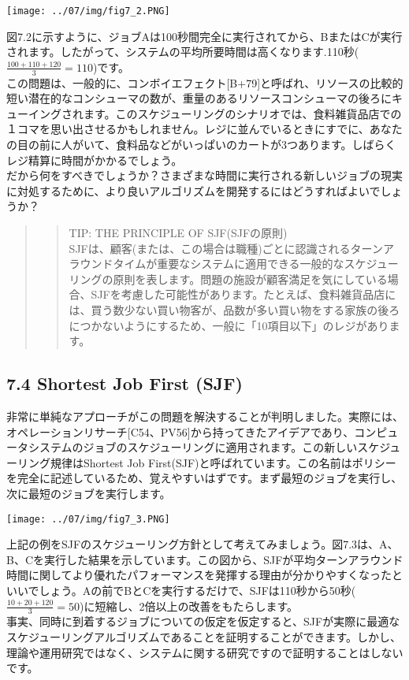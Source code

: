 \texttt{[image: ../07/img/fig7\_2.PNG]}

図7.2に示すように、ジョブAは100秒間完全に実行されてから、BまたはCが実行されます。したがって、システムの平均所要時間は高くなります.110秒(\(\frac{100 + 110 + 120}{3} = 110\))です。\\
この問題は、一般的に、コンボイエフェクト{[}B+79{]}と呼ばれ、リソースの比較的短い潜在的なコンシューマの数が、重量のあるリソースコンシューマの後ろにキューイングされます。このスケジューリングのシナリオでは、食料雑貨品店での１コマを思い出させるかもしれません。レジに並んでいるときにすでに、あなたの目の前に人がいて、食料品などがいっぱいのカートが3つあります。しばらくレジ精算に時間がかかるでしょう。\\
だから何をすべきでしょうか？さまざまな時間に実行される新しいジョブの現実に対処するために、より良いアルゴリズムを開発するにはどうすればよいでしょうか？

\begin{quote}
\begin{quote}
TIP: THE PRINCIPLE OF SJF(SJFの原則)\\
SJFは、顧客(または、この場合は職種)ごとに認識されるターンアラウンドタイムが重要なシステムに適用できる一般的なスケジューリングの原則を表します。問題の施設が顧客満足を気にしている場合、SJFを考慮した可能性があります。たとえば、食料雑貨品店には、買う数少ない買い物客が、品数が多い買い物をする家族の後ろにつかないようにするため、一般に「10項目以下」のレジがあります。
\end{quote}
\end{quote}

\hypertarget{shortest-job-first-sjf}{%
\subsection*{7.4 Shortest Job First (SJF)}\label{shortest-job-first-sjf}}

非常に単純なアプローチがこの問題を解決することが判明しました。実際には、オペレーションリサーチ{[}C54、PV56{]}から持ってきたアイデアであり、コンピュータシステムのジョブのスケジューリングに適用されます。この新しいスケジューリング規律はShortest
Job
First(SJF)と呼ばれています。この名前はポリシーを完全に記述しているため、覚えやすいはずです。まず最短のジョブを実行し、次に最短のジョブを実行します。

\texttt{[image: ../07/img/fig7\_3.PNG]}

上記の例をSJFのスケジューリング方針として考えてみましょう。図7.3は、A、B、Cを実行した結果を示しています。この図から、SJFが平均ターンアラウンド時間に関してより優れたパフォーマンスを発揮する理由が分かりやすくなったといいでしょう。Aの前でBとCを実行するだけで、SJFは110秒から50秒(
\(\frac{10+20+120}{3} = 50\))に短縮し、2倍以上の改善をもたらします。\\
事実、同時に到着するジョブについての仮定を仮定すると、SJFが実際に最適なスケジューリングアルゴリズムであることを証明することができます。しかし、理論や運用研究ではなく、システムに関する研究ですので証明することはしないです。

